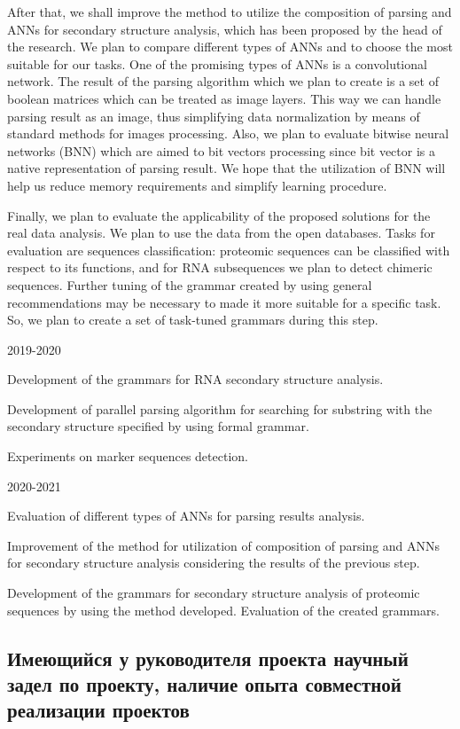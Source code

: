 \documentclass[12pt]{article}  %
\theoremstyle{remark}
\begin{document}
After that, we shall improve the method to utilize the composition of parsing and ANNs for secondary structure analysis, which has been proposed by the head of the research.
We plan to compare different types of ANNs and to choose the most suitable for our tasks.
One of the promising types of ANNs is a convolutional network.
The result of the parsing algorithm which we plan to create is a set of boolean matrices which can be treated as image layers.
This way we can handle parsing result as an image, thus simplifying data normalization by means of standard methods for images processing.
Also, we plan to evaluate bitwise neural networks (BNN) which are aimed to bit vectors processing since bit vector is a native representation of parsing result.
We hope that the utilization of BNN will help us reduce memory requirements and simplify learning procedure.

Finally, we plan to evaluate the applicability of the proposed solutions for the real data analysis.
We plan to use the data from the open databases.
Tasks for evaluation are sequences classification: proteomic sequences can be classified with respect to its functions, and for RNA subsequences we plan to detect chimeric sequences.
Further tuning of the grammar created by using general recommendations may be necessary to made it more suitable for a specific task.
So, we plan to create a set of task-tuned grammars during this step.

2019-2020

Development of the grammars for RNA secondary structure analysis.

Development of parallel parsing algorithm for searching for substring with the secondary structure specified by using formal grammar.

Experiments on marker sequences detection.


2020-2021

Evaluation of different types of ANNs for parsing results analysis.

Improvement of the method for utilization of composition of parsing and ANNs for secondary structure analysis considering the results of the previous step.

Development of the grammars for secondary structure analysis of proteomic sequences by using the method developed.
Evaluation of the created grammars.

\subsection{Имеющийся у руководителя проекта научный задел по проекту, наличие опыта совместной реализации проектов}
\end{document}
